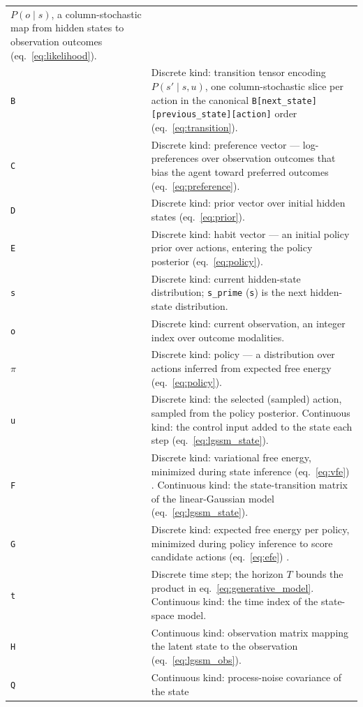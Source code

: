\documentclass[
  english,
  9pt,
]{extarticle}
\begin{document}
\begin{longtable}[]{@{}
  >{\raggedright\arraybackslash}p{}
  >{\raggedright\arraybackslash}p{}@{}}
\(P(o \mid s)\), a column-stochastic map from hidden states to
observation outcomes (eq.~\ref{eq:likelihood}). \\
\texttt{B} & Discrete kind: transition tensor encoding
\(P(s' \mid s, u)\), one column-stochastic slice per action in the
canonical \texttt{B{[}next\_state{]}{[}previous\_state{]}{[}action{]}}
order (eq.~\ref{eq:transition}). \\
\texttt{C} & Discrete kind: preference vector --- log-preferences over
observation outcomes that bias the agent toward preferred outcomes
(eq.~\ref{eq:preference}). \\
\texttt{D} & Discrete kind: prior vector over initial hidden states
(eq.~\ref{eq:prior}). \\
\texttt{E} & Discrete kind: habit vector --- an initial policy prior
over actions, entering the policy posterior (eq.~\ref{eq:policy}). \\
\texttt{s} & Discrete kind: current hidden-state distribution;
\texttt{s\_prime} (\texttt{s\textquotesingle{}}) is the next
hidden-state distribution. \\
\texttt{o} & Discrete kind: current observation, an integer index over
outcome modalities. \\
\texttt{\texorpdfstring{\ensuremath{\pi}}{pi}} & Discrete kind: policy --- a distribution over actions
inferred from expected free energy (eq.~\ref{eq:policy}). \\
\texttt{u} & Discrete kind: the selected (sampled) action, sampled from
the policy posterior. Continuous kind: the control input added to the
state each step (eq.~\ref{eq:lgssm_state}). \\
\texttt{F} & Discrete kind: variational free energy, minimized during
state inference (eq.~\ref{eq:vfe}) \citep{friston2010}. Continuous kind:
the state-transition matrix of the linear-Gaussian model
(eq.~\ref{eq:lgssm_state}). \\
\texttt{G} & Discrete kind: expected free energy per policy, minimized
during policy inference to score candidate actions (eq.~\ref{eq:efe})
\citep{dacosta2020}. \\
\texttt{t} & Discrete time step; the horizon \(T\) bounds the product in
eq.~\ref{eq:generative_model}. Continuous kind: the time index of the
state-space model. \\
\texttt{H} & Continuous kind: observation matrix mapping the latent
state to the observation (eq.~\ref{eq:lgssm_obs}). \\
\texttt{Q} & Continuous kind: process-noise covariance of the state

\end{longtable}
\end{document}
